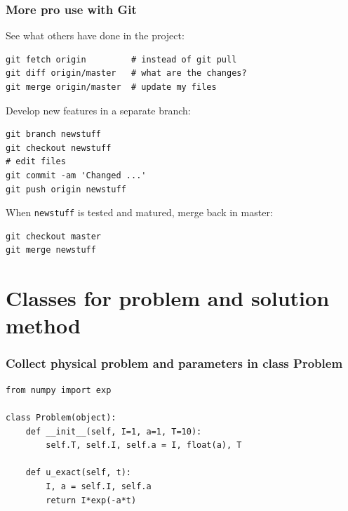 \documentclass{beamer}
\begin{document}
\begin{frame}
\frametitle{More pro use with Git}

See what others have done in the project:

\begin{verbatim}
git fetch origin         # instead of git pull
git diff origin/master   # what are the changes?
git merge origin/master  # update my files
\end{verbatim}

Develop new features in a separate branch:

\begin{verbatim}
git branch newstuff
git checkout newstuff
# edit files
git commit -am 'Changed ...'
git push origin newstuff
\end{verbatim}
When \texttt{newstuff} is tested and matured, merge back in master:

\begin{verbatim}
git checkout master
git merge newstuff
\end{verbatim}
\end{frame}

\section{Classes for problem and solution method}
\label{softeng1:prog:se:class}

\begin{frame}
\frametitle{Collect physical problem and parameters in class Problem}

\begin{verbatim}
from numpy import exp

class Problem(object):
    def __init__(self, I=1, a=1, T=10):
        self.T, self.I, self.a = I, float(a), T

    def u_exact(self, t):
        I, a = self.I, self.a
        return I*exp(-a*t)
\end{verbatim}
\end{frame}
\end{document}
